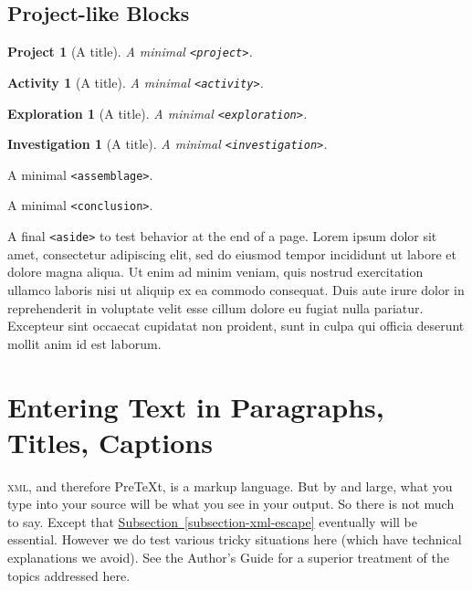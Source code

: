 \documentclass{sn-jnl}
\theoremstyle{thmstyleone}%
\theoremstyle{thmstyletwo}%
\newtheorem{activity}[theorem]{Activity}
\newtheorem{investigation}[theorem]{Investigation}
\newtheorem{exploration}[theorem]{Exploration}
\newtheorem{project}[theorem]{Project}
\theoremstyle{thmstylethree}%
\newcommand{\xreffont}{\relax}
\newcommand{\mono}[1]{\texttt{#1}}
\newcommand{\initialism}[1]{\textsc{\MakeLowercase{#1}}}
\DeclareRobustCommand{\initialismintitle}[1]{\texorpdfstring{#1}{#1}}
\numberwithin{equation}{section}
\begin{document}
\subsection{Project-like Blocks}\label{block-samples-project-like}%
\begin{project}[A title]\label{block-samples-project-like-2}%
%
A minimal \mono{<project>}.%
\end{project}%
\begin{activity}[A title]\label{block-samples-project-like-3}%
%
A minimal \mono{<activity>}.%
\end{activity}%
\begin{exploration}[A title]\label{block-samples-project-like-4}%
%
A minimal \mono{<exploration>}.%
\end{exploration}%
\begin{investigation}[A title]\label{block-samples-project-like-5}%
%
A minimal \mono{<investigation>}.%
\end{investigation}%
\begin{assemblage}\label{block-samples-12}%
%
A minimal \mono{<assemblage>}.%
\end{assemblage}
A minimal \mono{<conclusion>}.%
\begin{aside}[A title.]\label{block-samples-14}%
%
A final \mono{<aside>} to test behavior at the end of a page. Lorem ipsum dolor sit amet, consectetur adipiscing elit, sed do eiusmod tempor incididunt ut labore et dolore magna aliqua. Ut enim ad minim veniam, quis nostrud exercitation ullamco laboris nisi ut aliquip ex ea commodo consequat. Duis aute irure dolor in reprehenderit in voluptate velit esse cillum dolore eu fugiat nulla pariatur. Excepteur sint occaecat cupidatat non proident, sunt in culpa qui officia deserunt mollit anim id est laborum.%
\end{aside}
%
%
\typeout{************************************************}
\typeout{************************************************}
%
\section{Entering Text in Paragraphs, Titles, Captions}\label{section-text-paragraphs}%
\initialism{XML}, and therefore PreTeXt, is a markup language.  But by and large, what you type into your source will be what you see in your output.  So there is not much to say.  Except that \hyperref[subsection-xml-escape]{Subsection~{\xreffont\ref{subsection-xml-escape}}} eventually will be essential.  However we do test various tricky situations here (which have technical explanations we avoid).  See the Author's Guide for a superior treatment of the topics addressed here.%
%
%
\typeout{************************************************}
\typeout{Subsection 1 Special \initialismintitle{XML} characters}
\typeout{************************************************}
%
\end{document}
